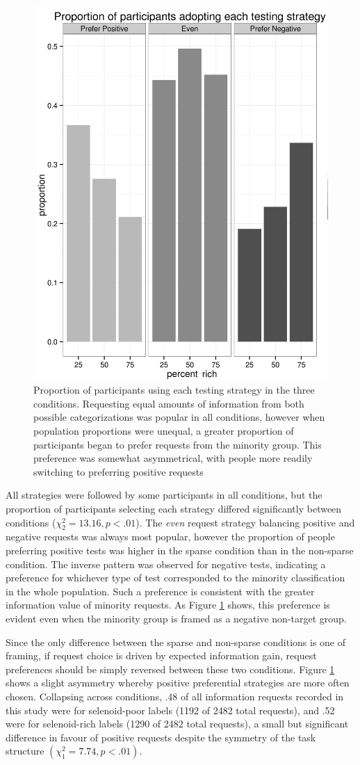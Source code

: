 \documentclass[10pt,letterpaper]{article}
\begin{document}
\begin{figure}[t]
\includegraphics[width=.5\textwidth]{sidebysidebar3_nolegendbw.png}
\caption{Proportion of participants using each testing strategy in the three conditions. Requesting equal amounts of information from both possible categorizations was popular in all conditions, however when population proportions were unequal, a greater proportion of participants began to prefer requests from the minority group. This preference was somewhat asymmetrical, with people more readily switching to preferring positive requests}
\label{sidebysidebar3}
\end{figure}

All strategies were followed by some participants in all conditions, but the proportion of participants selecting each strategy differed significantly between conditions ($\chi^2_2=13.16,p<.01$). %
The \textit{even} request strategy balancing positive and negative requests was always most popular, however the proportion of people preferring positive tests was higher in the {\sc sparse} condition than in the {\sc non-sparse} condition. The inverse pattern was observed for negative tests, indicating a preference for whichever type of test corresponded to the minority classification in the whole population. Such a preference is consistent with the greater information value of minority requests. As Figure \ref{sidebysidebar3} shows, this preference is evident even when the minority group is framed as a negative non-target group.

Since the only difference between the {\sc sparse} and {\sc non-sparse} conditions is one of framing, if request choice is driven by expected information gain, request preferences should be simply reversed between these two conditions. Figure \ref{sidebysidebar3} shows a slight asymmetry whereby positive preferential strategies are more often chosen. Collapsing across conditions, .48 of all information requests recorded in this study were for selenoid-poor labels (1192 of 2482 total requests), and .52 were for selenoid-rich labels (1290 of 2482 total requests), a small but significant difference in favour of positive requests despite the symmetry of the task structure $(\chi^2_1=7.74, p<.01)$. %
\end{document}
